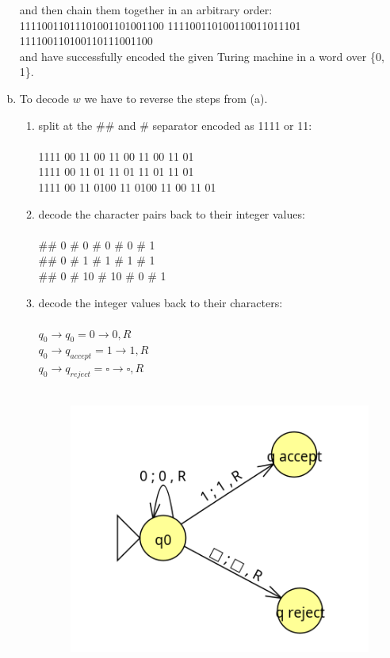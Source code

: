 \documentclass{article} %
\begin{document}
\begin{enumerate}[(a)]
and then chain them together in an arbitrary order:\\
11110011011101001101001100 111100110100110011011101 111100110100110111001100\\
and have successfully encoded the given Turing machine in a word over \{0, 1\}.

\clearpage

\item
To decode $w$ we have to reverse the steps from (a).

\begin{enumerate}[1.]
\item split at the $\#\#$ and $\#$ separator encoded as 1111 or 11:\\\\
1111 00 11 00 11 00 11 00 11 01 \\
1111 00 11 01 11 01 11 01 11 01 \\
1111 00 11 0100 11 0100 11 00 11 01 \\

\item decode the character pairs back to their integer values:\\\\
\#\# 0 \# 0 \# 0 \# 0 \# 1 \\
\#\# 0 \# 1 \# 1 \# 1 \# 1 \\
\#\# 0 \# 10 \# 10 \# 0 \# 1 \\

\item decode the integer values back to their characters:\\\\
$q_0 \to q_0 = 0 \to 0, R$\\
$q_0 \to q_{accept} = 1 \to 1, R$\\
$q_0 \to q_{reject} = \square \to \square, R$\\\\

\begin{figure}[H]
		\includegraphics[scale=0.45]{ex4b.png}
		\centering
\end{figure}

\end{enumerate}
\end{enumerate}
\end{document}
